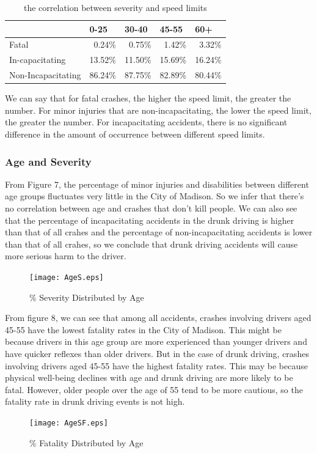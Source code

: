 \documentclass[15pt]{article}
\begin{document}
\begin{table}[htbp]
  \centering
  \caption{the correlation between severity and speed limits}
    \begin{tabular}{lrrrr}
    \hline
          & \multicolumn{1}{l}{0-25} & \multicolumn{1}{l}{30-40} & \multicolumn{1}{l}{45-55} & \multicolumn{1}{l}{60+} \\
    \hline
    Fatal & 0.24\% & 0.75\% & 1.42\% & 3.32\% \\
    In-capacitating & 13.52\% & 11.50\% & 15.69\% & 16.24\% \\
    Non-Incapacitating & 86.24\% & 87.75\% & 82.89\% & 80.44\% \\
    \hline
    \end{tabular}%
  \label{tab:addlabel}%
\end{table}%
\newpage
We can say that for fatal crashes, the higher the speed limit, the greater the number. For minor injuries that are non-incapacitating, the lower the speed limit, the greater the number. For incapacitating accidents, there is no significant difference in the amount of occurrence between different speed limits.

\subsubsection{Age and Severity}
From Figure 7, the percentage of minor injuries and disabilities between different age groups fluctuates very little in the City of Madison. So we infer that there's no correlation between age and crashes that don't kill people. We can also see that the percentage of incapacitating accidents in the drunk driving is higher than that of all crahes and the percentage of non-incapacitating accidents is lower than that of all crahes, so we conclude that drunk driving accidents will cause more serious harm to the driver.
\begin{figure}[H]
\centering
\texttt{[image: AgeS.eps]}
\caption{\% Severity Distributed by Age}
\label{19}
\end{figure}
\newpage
From figure 8, we can see that among all accidents, crashes involving drivers aged 45-55 have the lowest fatality rates in the City of Madison. This might be because drivers in this age group are more experienced than younger drivers and have quicker reflexes than older drivers. But in the case of drunk driving, crashes involving drivers aged 45-55 have the highest fatality rates. This may be because physical well-being declines with age and drunk driving are more likely to be fatal. However, older people over the age of 55 tend to be more cautious, so the fatality rate in drunk driving events is not high.
\begin{figure}[H]
\centering
\texttt{[image: AgeSF.eps]}
\caption{\% Fatality Distributed by Age}
\label{21}
\end{figure}
\end{document}
